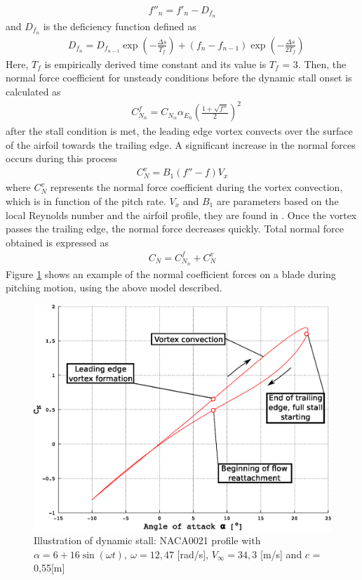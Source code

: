 \documentclass[a4paper]{jpconf}
\begin{document}
\begin{align}
f''_n = f'_n - D _{f_n}	   \label{dyndelay}
\end{align}
and $D_{f_n}$ is the deficiency function defined as
\begin{align}
& D_{f_n} = D_{f_{n-1}} \exp \left( - \frac{\Delta s}{T_f} \right) + (f_n - f_{n-1})\exp \left( - \frac{\Delta s}{2T_f} \right) \label{deff}
\end{align}
Here, $T_f$ is empirically derived time constant and its value is $T_f$ = 3. Then, the normal force coefficient for unsteady conditions before the dynamic stall onset is calculated as
\begin{align}
& C_{N_n}^f = C_{N_\alpha} \alpha_{E_n} \left( \frac{1 + \sqrt{f''}}{2} \right)^2	\label{CNf}
\end{align}
after the stall condition is met, the leading edge vortex convects over the surface of the airfoil towards the trailing edge. A significant increase in the normal forces occurs during this process
\begin{align}
C_N^v = B_1 (f'' - f) V_x \label{CNv}
\end{align}
where $C_N^v$ represents the normal force coefficient during the vortex convection, which is in function of the pitch rate. $V_x$ and $B_1$ are parameters based on the local Reynolds number and the airfoil profile, they are found in \cite{dyachuk2013dynamic}. Once the vortex passes the trailing edge, the normal force decreases quickly. Total normal force obtained is expressed as
\begin{align}
C_N = C_{N_n}^f + C_N^v \label{CNtotal}
\end{align}
Figure \ref{figpitching} shows an example of the normal coefficient forces on a blade during pitching motion, using the above model described.

\begin{figure}[h]
\begin{center}
\includegraphics[width=0.5\columnwidth]{CNpitching2.eps}
\end{center}
\caption{\label{figpitching} Illustration of dynamic stall: NACA0021 profile with $\alpha=6 + 16 \sin (\omega	t), \ \omega=12,47$ [rad/s], $V_\infty=34,3$ [m/s] and $c$ = 0,55[m]}
\end{figure}
\end{document}
